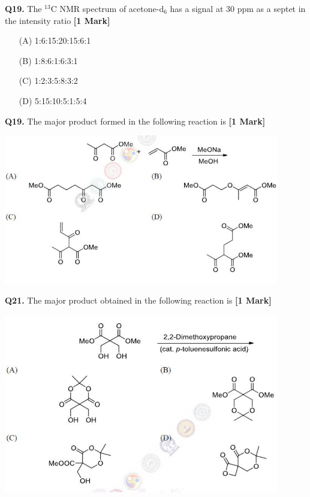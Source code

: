 \documentclass[11pt]{article}
\newcommand{\questiona}[2]{
    \noindent\textbf{Q#2.} #1 \hfill \textbf{[1 Mark]}
}
\begin{document}
\vspace{0.5cm}

\questiona{The \(^{13}\)C NMR spectrum of acetone-d\(_6\) has a signal at 30 ppm as a septet in the intensity ratio}{19}
\begin{enumerate}
    \item[(A)] 1:6:15:20:15:6:1
    \item[(B)] 1:8:6:1:6:3:1
    \item[(C)] 1:2:3:5:8:3:2
    \item[(D)] 5:15:10:5:1:5:4
\end{enumerate}
\vspace{0.5cm}

\questiona{The major product formed in the following reaction is}{19}
\begin{center}
\includegraphics[width=0.9\textwidth]{figures/20.png}
\end{center}

\vspace{0.5cm}

\questiona{The major product obtained in the following reaction is}{21}
\begin{center}
\includegraphics[width=0.9\textwidth]{figures/21.png}
\end{center}
\end{document}
